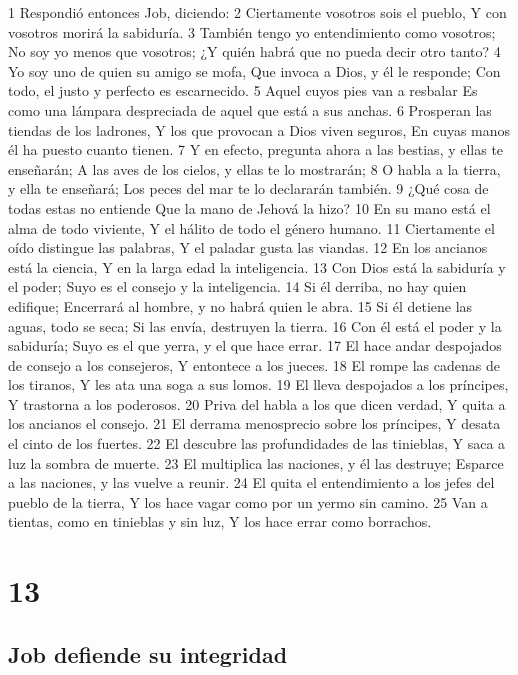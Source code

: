 1 Respondió entonces Job, diciendo:
2 Ciertamente vosotros sois el pueblo,
Y con vosotros morirá la sabiduría.
3 También tengo yo entendimiento como vosotros;
No soy yo menos que vosotros;
¿Y quién habrá que no pueda decir otro tanto? 
4 Yo soy uno de quien su amigo se mofa,
Que invoca a Dios, y él le responde;
Con todo, el justo y perfecto es escarnecido.
5 Aquel cuyos pies van a resbalar
Es como una lámpara despreciada de aquel que está a sus anchas.
6 Prosperan las tiendas de los ladrones,
Y los que provocan a Dios viven seguros,
En cuyas manos él ha puesto cuanto tienen.
7 Y en efecto, pregunta ahora a las bestias, y ellas te enseñarán;
A las aves de los cielos, y ellas te lo mostrarán;
8 O habla a la tierra, y ella te enseñará;
Los peces del mar te lo declararán también.
9 ¿Qué cosa de todas estas no entiende
Que la mano de Jehová la hizo?
10 En su mano está el alma de todo viviente,
Y el hálito de todo el género humano.
11 Ciertamente el oído distingue las palabras,
Y el paladar gusta las viandas.
12 En los ancianos está la ciencia,
Y en la larga edad la inteligencia.
13 Con Dios está la sabiduría y el poder;
Suyo es el consejo y la inteligencia.
14 Si él derriba, no hay quien edifique;
Encerrará al hombre, y no habrá quien le abra.
15 Si él detiene las aguas, todo se seca;
Si las envía, destruyen la tierra.
16 Con él está el poder y la sabiduría;
Suyo es el que yerra, y el que hace errar. 
17 El hace andar despojados de consejo a los consejeros,
Y entontece a los jueces.
18 El rompe las cadenas de los tiranos,
Y les ata una soga a sus lomos.
19 El lleva despojados a los príncipes,
Y trastorna a los poderosos.
20 Priva del habla a los que dicen verdad,
Y quita a los ancianos el consejo. 
21 El derrama menosprecio sobre los príncipes,
Y desata el cinto de los fuertes.
22 El descubre las profundidades de las tinieblas,
Y saca a luz la sombra de muerte.
23 El multiplica las naciones, y él las destruye;
Esparce a las naciones, y las vuelve a reunir.
24 El quita el entendimiento a los jefes del pueblo de la tierra,
Y los hace vagar como por un yermo sin camino.
25 Van a tientas, como en tinieblas y sin luz,
Y los hace errar como borrachos.

\chapter{13}

\section*{Job defiende su integridad}

